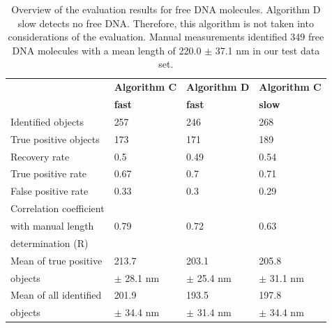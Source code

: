 \documentclass{article}
\begin{document}
\begin{table}[!htbp]
	\centering
	\caption{Overview of the evaluation results for free DNA molecules. Algorithm D slow detects no free DNA. Therefore, this algorithm is not taken into considerations of the evaluation. Manual measurements identified 349 free DNA molecules with a mean length of 220.0 $\pm$ 37.1 nm in our test data set.}
	\begin{tabular*}{\textwidth}{llll} \hline
		\textbf{} & \textbf{Algorithm C} & \textbf{Algorithm D} & \textbf{Algorithm C} \\
		\textbf{} & \textbf{fast} & \textbf{fast} & \textbf{slow} \\ \hline
		Identified objects & 257   & 246   & 268 \\
		True positive objects & 173   & 171   & 189 \\
		Recovery rate & 0.5   & 0.49  & 0.54 \\
		True positive rate & 0.67  & 0.7   & 0.71 \\
		False positive rate & 0.33  & 0.3   & 0.29 \\
		Correlation coefficient  & & &  \\
		with manual length & 0.79  & 0.72  & 0.63 \\
		determination (R) & & & \\
		Mean of true positive & 213.7 & 203.1 & 205.8 \\
		objects & $\pm$ 28.1 nm & $\pm$ 25.4 nm & $\pm$ 31.1 nm \\
		Mean of all identified & 201.9  & 193.5 & 197.8  \\ 
		objects & $\pm$ 34.4 nm & $\pm$ 31.4 nm & $\pm$ 34.4 nm \\ \hline
	\end{tabular*}%
	\label{tab:validation_table3}%
\end{table}%
\end{document}
